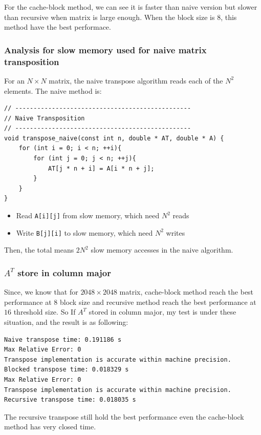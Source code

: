 \documentclass[11pt]{article}
\begin{document}
For the cache-block method, we can see it is faster than naive version but slower than recursive when matrix is large enough. When the block size is $8$, this method have the best performace.

\newpage

\subsubsection{Analysis for slow memory used for naive matrix transposition}
For an $N \times N$ matrix, the naive transpose algorithm reads each of the $N^2$ elements. The naive method is:
\begin{lstlisting}[style=C++Style]
// ------------------------------------------------
// Naive Transposition
// ------------------------------------------------
void transpose_naive(const int n, double * AT, double * A) {
    for (int i = 0; i < n; ++i){
        for (int j = 0; j < n; ++j){
            AT[j * n + i] = A[i * n + j]; 
        }
    }
}
\end{lstlisting}
\begin{itemize}
    \item Read \verb|A[i][j]| from slow memory, which need $N^2$ reads
    \item Write \verb|B[j][i]| to slow memory, which need $N^2$ writes
\end{itemize}
Then, the total means $2N^2$ slow memory accesses in the naive algorithm.

\subsubsection{$A^T$ store in column major}
Since, we know that for $2048 \times 2048$ matrix, cache-block method reach the best performance at $8$ block size and recursive method reach the best performance at $16$ threshold size. So If $A^T$ stored in column major, my test is under these situation, and the result is as following:
\begin{lstlisting}[style=C++Style]
Naive transpose time: 0.191186 s
Max Relative Error: 0
Transpose implementation is accurate within machine precision.
Blocked transpose time: 0.018329 s
Max Relative Error: 0
Transpose implementation is accurate within machine precision.
Recursive transpose time: 0.018035 s
\end{lstlisting}
The recursive transpose still hold the best performance even the cache-block method has very closed time.

\newpage
\end{document}
